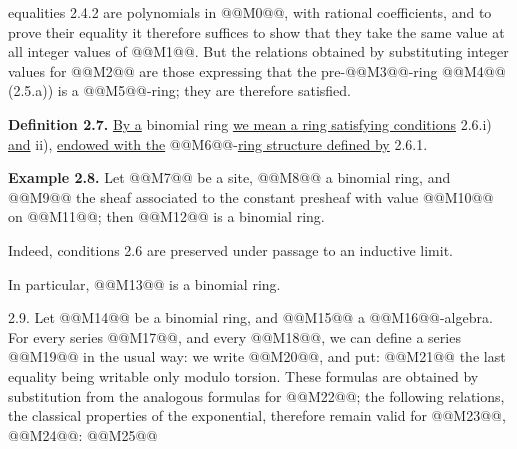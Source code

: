 equalities 2.4.2 are polynomials in @@M0@@, with rational coefficients, and to prove their equality it therefore suffices to show that they take the same value at all integer values of @@M1@@. But the relations obtained by substituting integer values for @@M2@@ are those expressing that the pre-@@M3@@-ring @@M4@@ (2.5.a)) is a @@M5@@-ring; they are therefore satisfied.

\textbf{Definition 2.7.} \uline{By a} binomial ring \uline{we mean a ring satisfying conditions} 2.6.i) \uline{and} ii), \uline{endowed with the} @@M6@@-\uline{ring structure defined by} 2.6.1.

\textbf{Example 2.8.} Let @@M7@@ be a site, @@M8@@ a binomial ring, and @@M9@@ the sheaf associated to the constant presheaf with value @@M10@@ on @@M11@@; then @@M12@@ is a binomial ring.

Indeed, conditions 2.6 are preserved under passage to an inductive limit.

In particular, @@M13@@ is a binomial ring.

2.9. Let @@M14@@ be a binomial ring, and @@M15@@ a @@M16@@-algebra. For every series @@M17@@, and every @@M18@@, we can define a series @@M19@@ in the usual way: we write @@M20@@, and put:
@@M21@@
the last equality being writable only modulo torsion. These formulas are obtained by substitution from the analogous formulas for @@M22@@; the following relations, the classical properties of the exponential, therefore remain valid for @@M23@@, @@M24@@:
@@M25@@

\providecommand{\Ghat}{\widehat G}
\providecommand{\Gg}{\widehat G_g}
\providecommand{\Gcirc}{\widehat G_{\circ}}
\providecommand{\Gnabla}{\widehat G_{\nabla}}
\providecommand{\Grhat}{\widehat{\operatorname{Gr}}}
\providecommand{\Log}{\operatorname{Log}}
\providecommand{\Fil}{\operatorname{Fil}}
\providecommand{\eps}{\varepsilon}
\providecommand{\id}{\operatorname{id}}
\providecommand{\Sym}{\operatorname{Sym}}
\providecommand{\Mon}{\operatorname{Mon}}

\providecommand{\Ghat}{\widehat G}
\providecommand{\Gg}{\widehat G_g}
\providecommand{\Gcirc}{\widehat G_{\circ}}
\providecommand{\Gnabla}{\widehat G_{\nabla}}
\providecommand{\Grhat}{\widehat{\operatorname{Gr}}}
\providecommand{\Log}{\operatorname{Log}}
\providecommand{\Fil}{\operatorname{Fil}}
\providecommand{\eps}{\varepsilon}
\renewcommand{\id}{\operatorname{id}}
\providecommand{\Sym}{\operatorname{Sym}}
\providecommand{\Mon}{\operatorname{Mon}}

